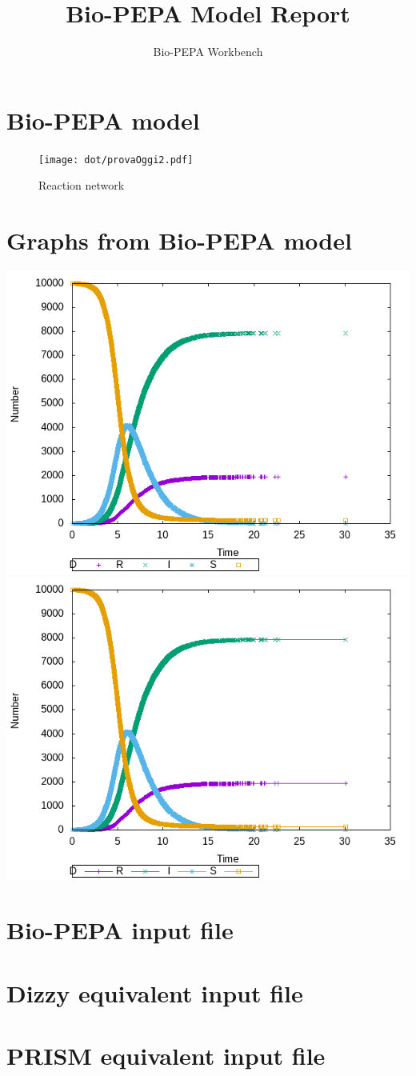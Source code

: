 \documentclass{llncs}
\title{Bio-PEPA Model Report}
\author{Bio-PEPA Workbench}
\institute{\today}
\begin{document}
\maketitle
\section{Bio-PEPA model}

\begin{figure}[htbp]
\begin{center}
\texttt{[image: dot/provaOggi2.pdf]}
\caption{Reaction network}
\end{center}
\end{figure}
\newpage
\section{Graphs from Bio-PEPA model}
\includegraphics[scale=0.5]{png/provaOggi2001_stochkit_results_0}
\hfill
\includegraphics[scale=0.5]{png/provaOggi2001_stochkit_results_1}
\appendix
\newpage
\section{Bio-PEPA input file}

\newpage
\section{Dizzy equivalent input file}

\newpage
\section{PRISM equivalent input file}

\end{document}
